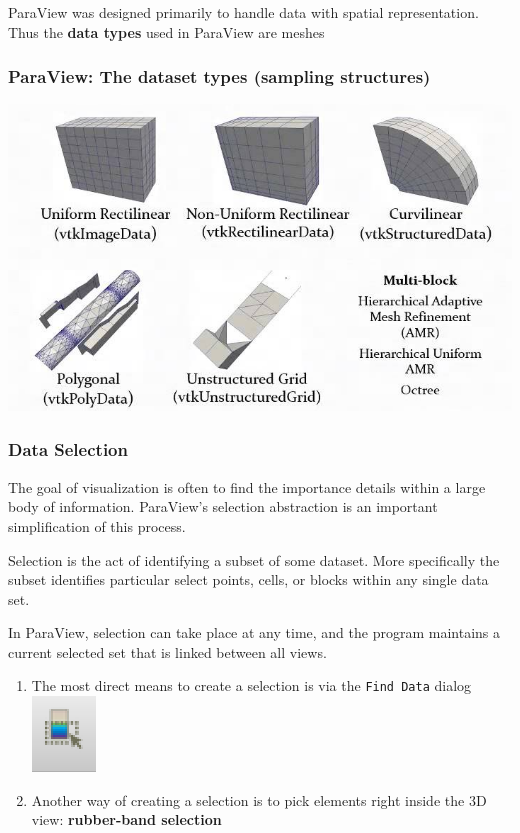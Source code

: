 \documentclass[]{beamer}
\begin{document}
\begin{frame}
\begin{columns}
\begin{minipage}[c][0.4\textheight][c]{\linewidth}
\end{minipage}
\end{columns}
\end{frame}


\begin{frame}
ParaView was designed primarily to handle data with spatial representation. Thus the {\bf data types} used in ParaView are meshes 
\frametitle{ParaView: The dataset types (sampling structures)}
    \includegraphics[width=.88\textwidth]{pics/vtk_dataformat}
\end{frame}

\begin{frame}
\frametitle{Data Selection}
The goal of visualization is often to find the importance details within a large body of information. ParaView's selection abstraction is an important simplification of this process. \par Selection is the act of identifying a subset of some dataset. More specifically the subset identifies particular select points, cells, or blocks within any single data set. \par In ParaView, selection can take place at any time, and the program maintains a current selected set that is linked between all views. 
\begin{enumerate}
\item The most direct means to create a selection is via the \texttt{Find Data} dialog \includegraphics[width=0.04\linewidth]{pics/Paraview_filter}
\item Another way of creating a selection is to pick elements right inside the 3D view: {\bf rubber-band selection}
\end{enumerate}
\end{frame}
\end{document}
